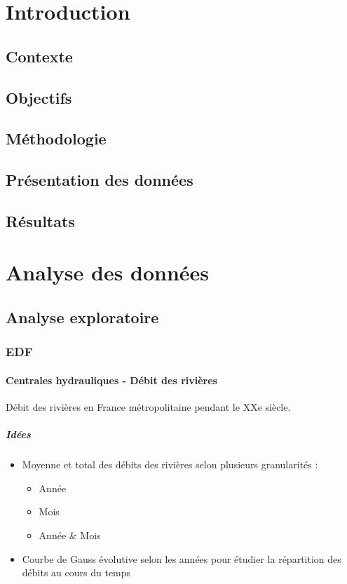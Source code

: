\documentclass[english,12pt,twoside,a4paper]{report}
\begin{document}
\setlength{\columnsep}{1cm}
\tableofcontents
\clearpage

\part{Introduction}
\chapter{Contexte}
\chapter{Objectifs}
\chapter{Méthodologie}
\chapter{Présentation des données}
\chapter{Résultats}
\part{Analyse des données}
\chapter{Analyse exploratoire}
\section{EDF}
\subsection{Centrales hydrauliques - Débit des rivières}
Débit des rivières en France métropolitaine pendant le XXe siècle.
\subsubsection{Idées}
\begin{itemize}
  \item Moyenne et total des débits des rivières selon plusieurs granularités :
  \begin{itemize}
    \item Année
    \item Mois
    \item Année \& Mois
  \end{itemize}
  \item Courbe de Gauss évolutive selon les années pour étudier la répartition des débits au cours du temps
\end{itemize}
\end{document}

